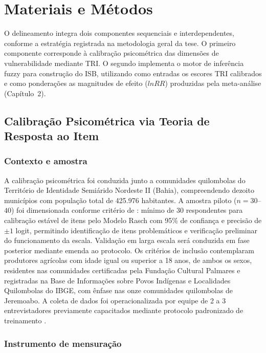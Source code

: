 \section{Materiais e Métodos}

O delineamento integra dois componentes sequenciais e interdependentes, conforme a estratégia registrada na metodologia geral da tese. O primeiro componente corresponde à calibração psicométrica das dimensões de vulnerabilidade mediante TRI. O segundo implementa o motor de inferência fuzzy para construção do ISB, utilizando como entradas os escores TRI calibrados e como ponderações as magnitudes de efeito ($lnRR$) produzidas pela meta-análise (Capítulo~2).


\subsection{Calibração Psicométrica via Teoria de Resposta ao Item}

\subsubsection{Contexto e amostra}

A calibração psicométrica foi conduzida junto a comunidades quilombolas do Território de Identidade Semiárido Nordeste II (Bahia), compreendendo dezoito municípios com população total de 425.976 habitantes. A amostra piloto ($n = 30$--$40$) foi dimensionada conforme critério de : mínimo de 30 respondentes para calibração estável de itens pelo Modelo Rasch com 95\% de confiança e precisão de $\pm 1$ logit, permitindo identificação de itens problemáticos e verificação preliminar do funcionamento da escala. Validação em larga escala será conduzida em fase posterior mediante emenda ao protocolo. Os critérios de inclusão contemplaram produtores agrícolas com idade igual ou superior a 18 anos, de ambos os sexos, residentes nas comunidades certificadas pela Fundação Cultural Palmares e registradas na Base de Informações sobre Povos Indígenas e Localidades Quilombolas do IBGE, com ênfase nas onze comunidades quilombolas de Jeremoabo. A coleta de dados foi operacionalizada por equipe de 2 a 3 entrevistadores previamente capacitados mediante protocolo padronizado de treinamento \cite{Fowler2014}.

\subsubsection{Instrumento de mensuração}

